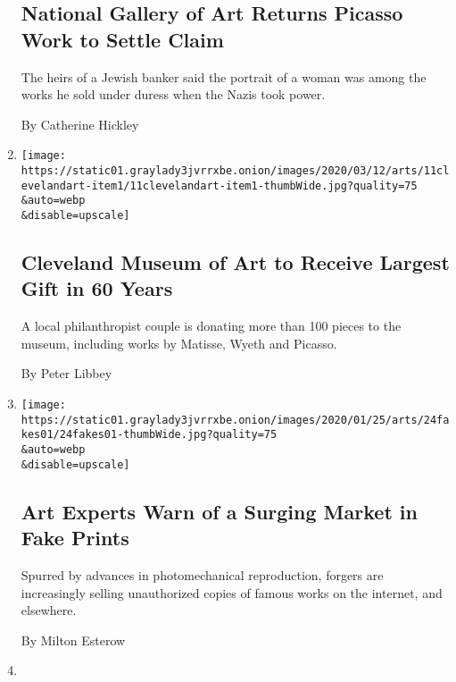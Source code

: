 \begin{enumerate}
{  \subsection{National Gallery of Art Returns Picasso Work to Settle
  Claim}\label{national-gallery-of-art-returns-picasso-work-to-settle-claim}}

  The heirs of a Jewish banker said the portrait of a woman was among
  the works he sold under duress when the Nazis took power.

  By Catherine Hickley
\item
  \href{/2020/03/11/arts/cleveland-museum-of-art-to-receive-largest-gift-in-60-years.html}{}

  \texttt{[image: https://static01.graylady3jvrrxbe.onion/images/2020/03/12/arts/11clevelandart-item1/11clevelandart-item1-thumbWide.jpg?quality=75\\\&auto=webp\\\&disable=upscale]}

  \hypertarget{cleveland-museum-of-art-to-receive-largest-gift-in-60-years}{%
  \subsection{Cleveland Museum of Art to Receive Largest Gift in 60
  Years}\label{cleveland-museum-of-art-to-receive-largest-gift-in-60-years}}

  A local philanthropist couple is donating more than 100 pieces to the
  museum, including works by Matisse, Wyeth and Picasso.

  By Peter Libbey
\item
  \href{/2020/01/24/arts/design/fake-art-prints.html}{}

  \texttt{[image: https://static01.graylady3jvrrxbe.onion/images/2020/01/25/arts/24fakes01/24fakes01-thumbWide.jpg?quality=75\\\&auto=webp\\\&disable=upscale]}

  \hypertarget{art-experts-warn-of-a-surging-market-in-fake-prints}{%
  \subsection{Art Experts Warn of a Surging Market in Fake
  Prints}\label{art-experts-warn-of-a-surging-market-in-fake-prints}}

  Spurred by advances in photomechanical reproduction, forgers are
  increasingly selling unauthorized copies of famous works on the
  internet, and elsewhere.

  By Milton Esterow
\item
  \href{/2019/12/18/arts/design/show-us-your-wall-olivier-picasso.html}{}


\end{enumerate}

